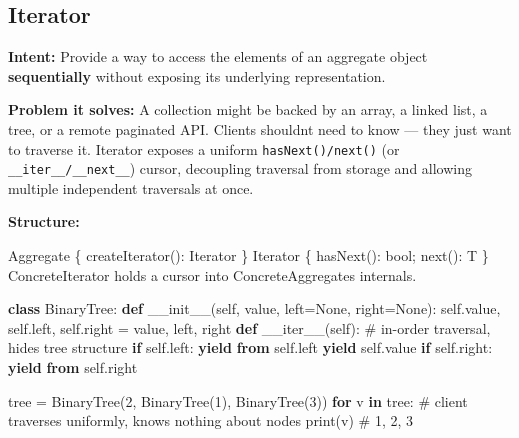 \documentclass[11pt]{article}
\newenvironment{Shaded}{\begin{snugshade}}{\end{snugshade}}
\newcommand{\BuiltInTok}[1]{\textcolor[rgb]{0.50,0.55,0.55}{#1}}
\newcommand{\CommentTok}[1]{\textcolor[rgb]{0.48,0.49,0.49}{#1}}
\newcommand{\ControlFlowTok}[1]{\textcolor[rgb]{0.99,0.74,0.29}{\textbf{#1}}}
\newcommand{\DecValTok}[1]{\textcolor[rgb]{0.96,0.45,0.00}{#1}}
\newcommand{\FunctionTok}[1]{\textcolor[rgb]{0.56,0.27,0.68}{#1}}
\newcommand{\KeywordTok}[1]{\textcolor[rgb]{0.81,0.81,0.76}{\textbf{#1}}}
\newcommand{\NormalTok}[1]{\textcolor[rgb]{0.81,0.81,0.76}{#1}}
\newcommand{\OperatorTok}[1]{\textcolor[rgb]{0.81,0.81,0.76}{#1}}
\newcommand{\StringTok}[1]{\textcolor[rgb]{0.96,0.31,0.31}{#1}}
\newcommand{\VariableTok}[1]{\textcolor[rgb]{0.15,0.68,0.68}{#1}}
\begin{document}
\subsection{Iterator}\label{iterator}

\textbf{Intent:} Provide a way to access the elements of an aggregate object \textbf{sequentially} without exposing its underlying representation.

\textbf{Problem it solves:} A collection might be backed by an array, a linked list, a tree, or a remote paginated API. Clients shouldn\textquotesingle t need to know --- they just want to traverse it. Iterator exposes a uniform \texttt{hasNext()/next()} (or \texttt{\_\_iter\_\_/\_\_next\_\_}) cursor, decoupling traversal from storage and allowing multiple independent traversals at once.

\textbf{Structure:}


\begin{Shaded}
\begin{Highlighting}[]
\NormalTok{Aggregate \{ createIterator(): Iterator \}}
\NormalTok{Iterator  \{ hasNext(): }\BuiltInTok{bool}\OperatorTok{;}  \BuiltInTok{next}\NormalTok{(): T \}}
\NormalTok{   ConcreteIterator holds a cursor into ConcreteAggregate}\StringTok{\textquotesingle{}s internals.}
\end{Highlighting}
\end{Shaded}


\begin{Shaded}
\begin{Highlighting}[]
\KeywordTok{class}\NormalTok{ BinaryTree:}
    \KeywordTok{def} \FunctionTok{\_\_init\_\_}\NormalTok{(}\VariableTok{self}\NormalTok{, value, left}\OperatorTok{=}\VariableTok{None}\NormalTok{, right}\OperatorTok{=}\VariableTok{None}\NormalTok{):}
        \VariableTok{self}\NormalTok{.value, }\VariableTok{self}\NormalTok{.left, }\VariableTok{self}\NormalTok{.right }\OperatorTok{=}\NormalTok{ value, left, right}
    \KeywordTok{def} \FunctionTok{\_\_iter\_\_}\NormalTok{(}\VariableTok{self}\NormalTok{):                    }\CommentTok{\# in{-}order traversal, hides tree structure}
        \ControlFlowTok{if} \VariableTok{self}\NormalTok{.left:  }\ControlFlowTok{yield} \ControlFlowTok{from} \VariableTok{self}\NormalTok{.left}
        \ControlFlowTok{yield} \VariableTok{self}\NormalTok{.value}
        \ControlFlowTok{if} \VariableTok{self}\NormalTok{.right: }\ControlFlowTok{yield} \ControlFlowTok{from} \VariableTok{self}\NormalTok{.right}

\NormalTok{tree }\OperatorTok{=}\NormalTok{ BinaryTree(}\DecValTok{2}\NormalTok{, BinaryTree(}\DecValTok{1}\NormalTok{), BinaryTree(}\DecValTok{3}\NormalTok{))}
\ControlFlowTok{for}\NormalTok{ v }\KeywordTok{in}\NormalTok{ tree:        }\CommentTok{\# client traverses uniformly, knows nothing about nodes}
    \BuiltInTok{print}\NormalTok{(v)          }\CommentTok{\# 1, 2, 3}
\end{Highlighting}
\end{Shaded}
\end{document}
